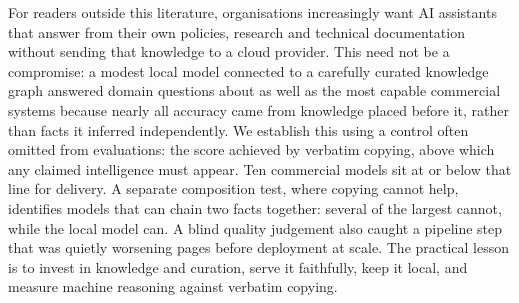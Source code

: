 \documentclass[10pt,twocolumn]{article}
\begin{document}
For readers outside this literature, organisations increasingly want AI assistants that answer from their own policies, research and technical documentation without sending that knowledge to a cloud provider. This need not be a compromise: a modest local model connected to a carefully curated knowledge graph answered domain questions about as well as the most capable commercial systems because nearly all accuracy came from knowledge placed before it, rather than facts it inferred independently. We establish this using a control often omitted from evaluations: the score achieved by verbatim copying, above which any claimed intelligence must appear. Ten commercial models sit at or below that line for delivery. A separate composition test, where copying cannot help, identifies models that can chain two facts together: several of the largest cannot, while the local model can. A blind quality judgement also caught a pipeline step that was quietly worsening pages before deployment at scale. The practical lesson is to invest in knowledge and curation, serve it faithfully, keep it local, and measure machine reasoning against verbatim copying.

\printbibliography
\end{document}
